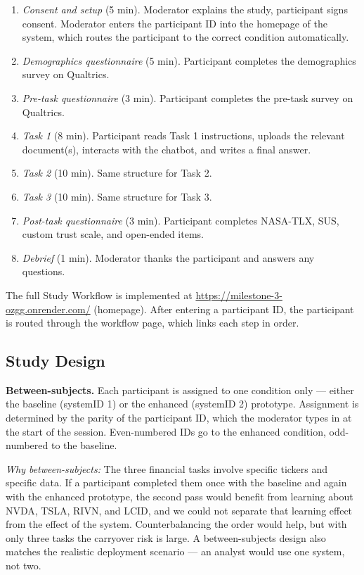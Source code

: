 \begin{enumerate}
    \item \textit{Consent and setup} (5 min). Moderator explains the study, participant signs consent. Moderator enters the participant ID into the homepage of the system, which routes the participant to the correct condition automatically.
    \item \textit{Demographics questionnaire} (5 min). Participant completes the demographics survey on Qualtrics.
    \item \textit{Pre-task questionnaire} (3 min). Participant completes the pre-task survey on Qualtrics.
    \item \textit{Task 1} (8 min). Participant reads Task 1 instructions, uploads the relevant document(s), interacts with the chatbot, and writes a final answer.
    \item \textit{Task 2} (10 min). Same structure for Task 2.
    \item \textit{Task 3} (10 min). Same structure for Task 3.
    \item \textit{Post-task questionnaire} (3 min). Participant completes NASA-TLX, SUS, custom trust scale, and open-ended items.
    \item \textit{Debrief} (1 min). Moderator thanks the participant and answers any questions.
\end{enumerate}

The full Study Workflow is implemented at \url{https://milestone-3-ozgg.onrender.com/} (homepage). After entering a participant ID, the participant is routed through the workflow page, which links each step in order.

\subsection{Study Design}

\textbf{Between-subjects.} Each participant is assigned to one condition only --- either the baseline (systemID 1) or the enhanced (systemID 2) prototype. Assignment is determined by the parity of the participant ID, which the moderator types in at the start of the session. Even-numbered IDs go to the enhanced condition, odd-numbered to the baseline.

\textit{Why between-subjects:} The three financial tasks involve specific tickers and specific data. If a participant completed them once with the baseline and again with the enhanced prototype, the second pass would benefit from learning about NVDA, TSLA, RIVN, and LCID, and we could not separate that learning effect from the effect of the system. Counterbalancing the order would help, but with only three tasks the carryover risk is large. A between-subjects design also matches the realistic deployment scenario --- an analyst would use one system, not two.

